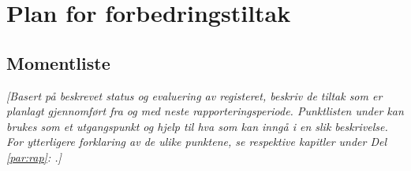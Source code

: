 \documentclass[norsk, a4paper, twocolumn]{report}
\newcommand{\guide}[1] {
	\textit{[\textcolor{guidegray}{#1}]}
	}
\begin{document}








\onecolumn
\part{Plan for forbedringstiltak}
\chapter{Momentliste}
\guide{Basert på beskrevet status og evaluering av registeret, beskriv de
tiltak som er planlagt gjennomført fra og med neste rapporteringsperiode.
Punktlisten under kan brukes som et utgangspunkt og hjelp til hva som kan
inngå i en slik beskrivelse. For ytterligere forklaring av de ulike punktene,
se respektive kapitler under Del \ref{par:rap}: \nameref{par:rap}.}
\end{document}
